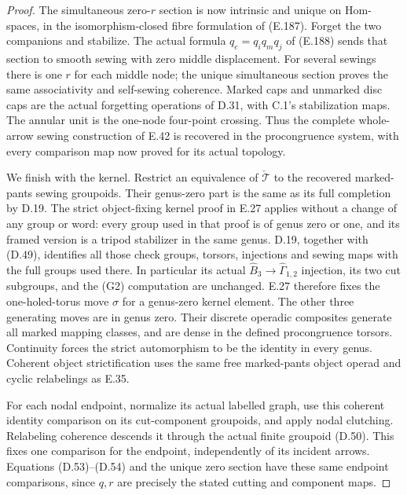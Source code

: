 \begin{proof}
The simultaneous zero-$r$ section is now
intrinsic and unique on Hom-spaces, in the
isomorphism-closed fibre formulation of
(E.187).  Forget the two companions and
stabilize.  The actual formula
$q_e=q_iq_mq_j$ of (E.188) sends that section
to smooth sewing with zero middle displacement.
For several sewings there is one $r$ for each
middle node; the unique simultaneous section
proves the same associativity and self-sewing
coherence.  Marked caps and unmarked disc caps
are the actual forgetting operations of D.31,
with C.1's stabilization maps.  The annular
unit is the one-node four-point crossing.
Thus the complete whole-arrow sewing
construction of E.42 is recovered in the
procongruence system, with every comparison
map now proved for its actual topology.

We finish with the kernel.  Restrict an
equivalence of $\check{\mathcal T}$ to the
recovered marked-pants sewing groupoids.
Their genus-zero part is the same as its
full completion by D.19.  The strict
object-fixing kernel proof in E.27 applies
without a change of any group or word:
every group used in that proof is of
genus zero or one, and its framed version
is a tripod stabilizer in the same genus.
D.19, together with (D.49), identifies
all those check groups, torsors, injections
and sewing maps with the full groups
used there.  In particular its actual
$\widehat B_3\to\widehat\Gamma_{1,2}$
injection, its two cut subgroups, and
the (G2) computation are unchanged.
E.27 therefore fixes the one-holed-torus
move $\sigma$ for a genus-zero kernel
element.  The other three generating
moves are in genus zero.  Their discrete
operadic composites generate all marked
mapping classes, and are dense in the
defined procongruence torsors.  Continuity
forces the strict automorphism to be
the identity in every genus.  Coherent
object strictification uses the same
free marked-pants object operad and
cyclic relabelings as E.35.

For each nodal endpoint, normalize its
actual labelled graph, use this coherent
identity comparison on its cut-component
groupoids, and apply nodal clutching.
Relabeling coherence descends it through
the actual finite groupoid (D.50).
This fixes one comparison for the endpoint,
independently of its incident arrows.
Equations (D.53)--(D.54) and the unique
zero section have these same endpoint
comparisons, since $q,r$ are precisely
the stated cutting and component maps.


\end{proof}
